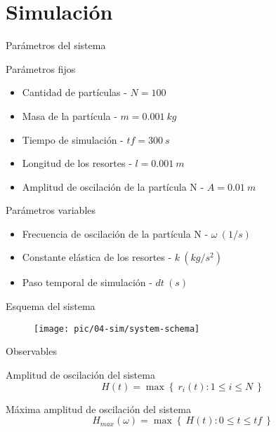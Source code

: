 \section{Simulación}\label{sec:simulacion}

\begin{frame}{Parámetros del sistema}
    \begin{block}{Parámetros fijos}
        \begin{itemize}
            \item Cantidad de partículas - $N = 100$
            \item Masa de la partícula - $m = 0.001\ kg$
            \item Tiempo de simulación - $tf = 300\ s$
            \item Longitud de los resortes - $l = 0.001\ m$
            \item Amplitud de oscilación de la partícula N - $A = 0.01\ m$
        \end{itemize}
    \end{block}
    \begin{block}{Parámetros variables}
        \begin{itemize}
            \item Frecuencia de oscilación de la partícula N - $\omega\ (1/s)$
            \item Constante elástica de los resortes - $k\ (kg/s^2)$
            \item Paso temporal de simulación - $dt\ (s)$
        \end{itemize}
    \end{block}
\end{frame}

\begin{frame}{Esquema del sistema}
    \begin{figure}[H]
        \centering
        \texttt{[image: pic/04-sim/system-schema]}\label{fig:figure-system-schema}
    \end{figure}
\end{frame}

\begin{frame}{Observables}
    \begin{block}{Amplitud de oscilación del sistema}
        \begin{equation*}
            H(t) = \max \left\{\ r_i(t) : 1 \leq i \leq N\ \right\}
        \end{equation*}
    \end{block}

    \begin{block}{Máxima amplitud de oscilación del sistema}
        \begin{equation*}
            H_{max}(\omega) = \max \left\{\ H(t) : 0 \leq t \leq tf\ \right\}
        \end{equation*}
    \end{block}
\end{frame}

